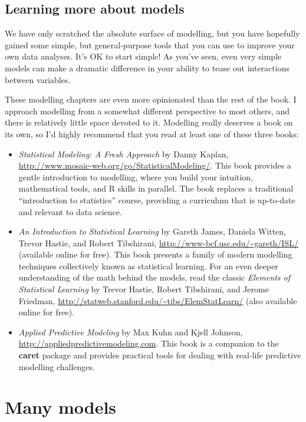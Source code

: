 \documentclass[]{book}
\begin{document}
\hypertarget{learning-more-about-models}{\section{Learning more about
models}\label{learning-more-about-models}}

We have only scratched the absolute surface of modelling, but you have
hopefully gained some simple, but general-purpose tools that you can use
to improve your own data analyses. It's OK to start simple! As you've
seen, even very simple models can make a dramatic difference in your
ability to tease out interactions between variables.

These modelling chapters are even more opinionated than the rest of the
book. I approach modelling from a somewhat different perspective to most
others, and there is relatively little space devoted to it. Modelling
really deserves a book on its own, so I'd highly recommend that you read
at least one of these three books:

\begin{itemize}
\item
  \emph{Statistical Modeling: A Fresh Approach} by Danny Kaplan,
  \url{http://www.mosaic-web.org/go/StatisticalModeling/}. This book
  provides a gentle introduction to modelling, where you build your
  intuition, mathematical tools, and R skills in parallel. The book
  replaces a traditional ``introduction to statistics'' course,
  providing a curriculum that is up-to-date and relevant to data
  science.
\item
  \emph{An Introduction to Statistical Learning} by Gareth James,
  Daniela Witten, Trevor Hastie, and Robert Tibshirani,
  \url{http://www-bcf.usc.edu/~gareth/ISL/} (available online for free).
  This book presents a family of modern modelling techniques
  collectively known as statistical learning. For an even deeper
  understanding of the math behind the models, read the classic
  \emph{Elements of Statistical Learning} by Trevor Hastie, Robert
  Tibshirani, and Jerome Friedman,
  \url{http://statweb.stanford.edu/~tibs/ElemStatLearn/} (also available
  online for free).
\item
  \emph{Applied Predictive Modeling} by Max Kuhn and Kjell Johnson,
  \url{http://appliedpredictivemodeling.com}. This book is a companion
  to the \textbf{caret} package and provides practical tools for dealing
  with real-life predictive modelling challenges.
\end{itemize}

\hypertarget{many-models}{\chapter{Many models}\label{many-models}}
\end{document}
